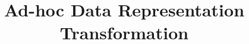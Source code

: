 \documentclass[runningheads,a4paper]{style/llncs}
\begin{document}
\mainmatter
\title{Ad-hoc Data Representation Transformation}
\maketitle


% 










\end{document}
